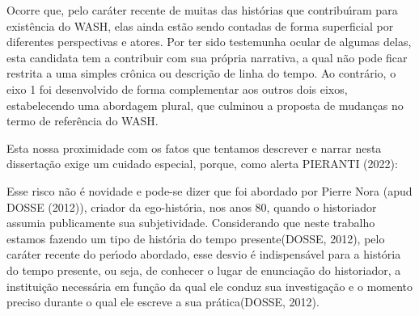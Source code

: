 \documentclass[
12pt,		%
openright,	%
twoside,  %
a4paper,			%
chapter=TITLE,		%
english,			%
french,				%
spanish,			%
brazil				%
]{USPSC-classe/USPSC}
\begin{document}
Ocorre que, pelo car\'ater recente de muitas das hist\'orias que contribu\'{\i}ram para exist\^encia do WASH, elas ainda est\~ao sendo contadas de forma superficial por diferentes perspectivas e atores. Por ter sido testemunha ocular de algumas delas, esta candidata tem a contribuir com sua pr\'opria narrativa, a qual n\~ao pode ficar restrita a uma simples cr\^onica ou descri\c{c}\~ao de linha do tempo. Ao contr\'ario, o eixo 1 foi desenvolvido de forma complementar aos outros dois eixos, estabelecendo uma abordagem plural, que culminou a proposta de mudan\c{c}as no termo de refer\^encia do WASH.









Esta nossa proximidade com os fatos que tentamos descrever e narrar nesta disserta\c{c}\~ao exige um cuidado especial, porque, como alerta  PIERANTI (2022):










\noindent\begin{center}\mbox{\centering{}}\end{center}


Esse risco n\~ao \'e novidade e pode-se dizer que foi abordado por Pierre Nora  (apud DOSSE (2012)), criador da ego-hist\'oria, nos anos 80, quando o historiador assumia publicamente sua subjetividade. Considerando que neste trabalho estamos fazendo um tipo de \textquotedbl hist\'oria do tempo presente\textquotedbl   (DOSSE, 2012), pelo car\'ater recente do per\'{\i}odo abordado, \textquotedbl esse desvio \'e indispens\'avel para a hist\'oria do tempo presente, ou seja, de conhecer o lugar de enuncia\c{c}\~ao do historiador, a institui\c{c}\~ao necess\'aria em fun\c{c}\~ao da qual ele conduz sua investiga\c{c}\~ao e o momento preciso durante o qual ele escreve a sua pr\'atica\textquotedbl   (DOSSE, 2012).
\end{document}
